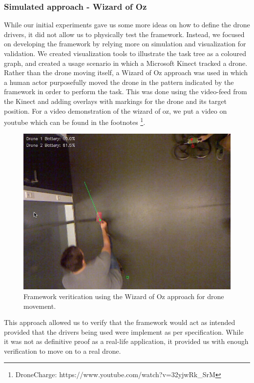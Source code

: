 \subsubsection{Simulated approach - Wizard of Oz}
While our initial experiments gave us some more ideas on how to define the drone drivers, it did not allow us to physically test the framework. Instead, we focused on developing the framework by relying more on simulation and visualization for validation. We created visualization tools to illustrate the task tree as a coloured graph, and created a usage scenario in which a Microsoft Kinect tracked a drone. Rather than the drone moving itself, a Wizard of Oz approach was used in which a human actor purposefully moved the drone in the pattern indicated by the framework in order to perform the task. This was done using the video-feed from the Kinect and adding overlays with markings for the drone and its target position. For a video demonstration of the wizard of oz, we put a video on youtube which can be found in the footnotes \footnote{DroneCharge: https://www.youtube.com/watch?v=32yjwRk\_SrM}.

\begin{figure}[h]
\centering
\includegraphics[width=\columnwidth]{images/wizardofoz.png}
\caption{Framework veritication using the Wizard of Oz approach for drone movement.}
\label{fig:wizardofoz}
\end{figure}

This approach allowed us to verify that the framework would act as intended provided that the drivers being used were implement as per specification.  While it was not as definitive proof as a real-life application, it provided us with enough verification to move on to a real drone.

